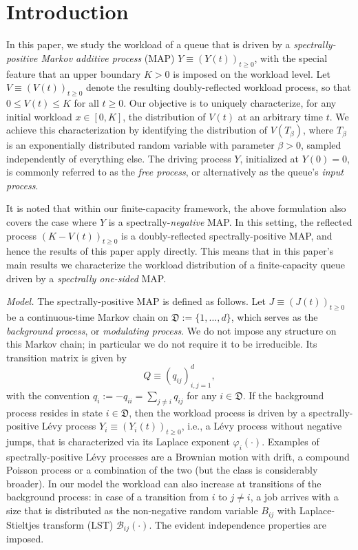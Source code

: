\documentclass[reqno,12pt]{amsart}
\newcommand{\defD}{{\mathfrak D}}
\begin{document}
	
	\maketitle

    \newpage

\section{Introduction}\label{sec: intro}
In this paper, we study the workload of a queue that is driven by a {\it spectrally-positive Markov additive process} (MAP) $Y\equiv (Y(t))_{t\geqslant 0}$, with the special feature that an upper boundary $K>0$ is imposed on the workload level. Let $V\equiv (V(t))_{t\geqslant 0}$ denote the resulting doubly-reflected workload process, so that $0 \leqslant V(t)\leqslant K$ for all $t\geqslant 0$. 
Our objective is to uniquely characterize, for any initial workload $x \in [0,K]$, the distribution of $V(t)$ at an arbitrary time $t$. We achieve this characterization by identifying the distribution of $V(T_\beta)$, where $T_\beta$ is an exponentially distributed random variable with parameter $\beta>0$, sampled independently of everything else.
The driving process $Y$, initialized at $Y(0)=0$, is commonly referred to as the {\it free process}, or alternatively as the queue's {\it input process}.

It is noted that within our finite-capacity framework, the above formulation also covers the case where $Y$ is a spectrally-{\it negative} MAP. In this setting, the reflected process $(K-V(t))_{t\geqslant 0}$ is a doubly-reflected spectrally-positive MAP, and hence the results of this paper apply directly. This means that in this paper's main results we characterize the workload distribution of a finite-capacity queue driven by a {\it spectrally one-sided} MAP.

\medskip


{\it Model.} The spectrally-positive MAP is defined as follows. Let $J\equiv (J(t))_{t\geqslant0}$ be a continuous-time Markov chain on  $\defD :=\{1,\ldots,d\}$, which serves as the \emph{background process}, or {\it modulating process}. We do not impose any structure on this Markov chain; in particular we do not require it to be irreducible. Its transition matrix is given by
\[Q \equiv (q_{ij})_{i,j=1}^d,\]
with the convention $q_i := -q_{ii} = \sum_{j\neq i} q_{ij}$ for any $i\in\defD $. If the background process resides in state $i\in\defD $, then the workload process is driven by a spectrally-positive L\'evy process $Y_i\equiv (Y_i(t))_{t\geqslant0}$, i.e., a L\'evy process without negative jumps, that is characterized via its Laplace exponent $\varphi_i(\cdot)$. Examples of spectrally-positive L\'evy processes are a Brownian motion with drift, a compound Poisson process or a combination of the two (but the class is considerably broader). In our model the workload can also increase at transitions of the background process: in case of a transition from $i$ to $j\not=i$, a job arrives with a size that is distributed as the non-negative random variable $B_{ij}$ with Laplace-Stieltjes transform (LST) ${\mathscr B}_{ij}(\cdot)$. The evident independence properties are imposed. 
\end{document}
